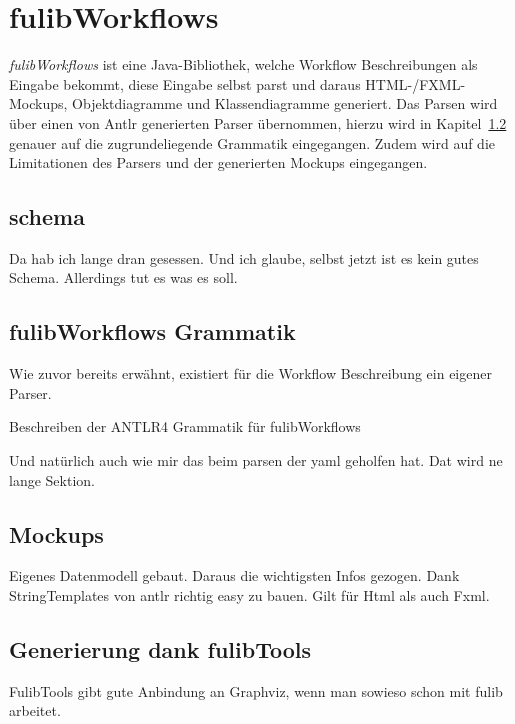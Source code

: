 \section{fulibWorkflows}\label{sec:fulibworkflows2}
\textit{fulibWorkflows} ist eine Java-Bibliothek, welche Workflow Beschreibungen als Eingabe bekommt, diese Eingabe
selbst parst und daraus HTML-/FXML-Mockups, Objektdiagramme und Klassendiagramme generiert.
Das Parsen wird über einen von Antlr generierten Parser übernommen, hierzu wird in Kapitel~\ref{subsec:fulibworkflows-grammatik} genauer auf
die zugrundeliegende Grammatik eingegangen.
Zudem wird auf die Limitationen des Parsers und der generierten Mockups eingegangen.



\subsection{schema}\label{subsec:schema}
Da hab ich lange dran gesessen.
Und ich glaube, selbst jetzt ist es kein gutes Schema.
Allerdings tut es was es soll.

\subsection{fulibWorkflows Grammatik}\label{subsec:fulibworkflows-grammatik}
Wie zuvor bereits erwähnt, existiert für die Workflow Beschreibung ein eigener Parser.

Beschreiben der ANTLR4 Grammatik für fulibWorkflows

Und natürlich auch wie mir das beim parsen der yaml geholfen hat.
Dat wird ne lange Sektion.

\subsection{Mockups}\label{subsec:mockups}
Eigenes Datenmodell gebaut.
Daraus die wichtigsten Infos gezogen.
Dank StringTemplates von antlr richtig easy zu bauen.
Gilt für Html als auch Fxml.

\subsection{Generierung dank fulibTools}\label{subsec:generierung-dank-fulibtools}
FulibTools gibt gute Anbindung an Graphviz, wenn man sowieso schon mit fulib arbeitet.
